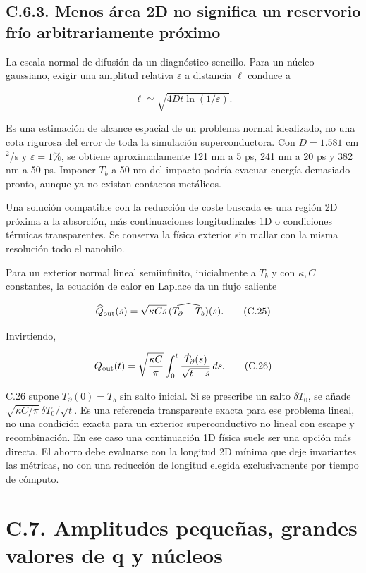 \documentclass[
  spanish,
  10pt,
  a4paper,
]{article}
\begin{document}
\subsection{C.6.3. Menos área 2D no significa un reservorio frío
arbitrariamente
próximo}\label{c.6.3.-menos-uxe1rea-2d-no-significa-un-reservorio-fruxedo-arbitrariamente-pruxf3ximo}

La escala normal de difusión da un diagnóstico sencillo. Para un núcleo
gaussiano, exigir una amplitud relativa \(\varepsilon\) a distancia
\(\ell\) conduce a

\[
\ell\simeq\sqrt{4Dt\ln(1/\varepsilon)}. \tag{C.24}
\]

Es una estimación de alcance espacial de un problema normal idealizado,
no una cota rigurosa del error de toda la simulación superconductora.
Con \(D=1.581\) cm\(^2\)/s y \(\varepsilon=1\%\), se obtiene
aproximadamente 121 nm a 5 ps, 241 nm a 20 ps y 382 nm a 50 ps. Imponer
\(T_b\) a 50 nm del impacto podría evacuar energía demasiado pronto,
aunque ya no existan contactos metálicos.

Una solución compatible con la reducción de coste buscada es una región
2D próxima a la absorción, más continuaciones longitudinales 1D o
condiciones térmicas transparentes. Se conserva la física exterior sin
mallar con la misma resolución todo el nanohilo.

Para un exterior normal lineal semiinfinito, inicialmente a \(T_b\) y
con \(\kappa,C\) constantes, la ecuación de calor en Laplace da un flujo
saliente

\[
\widehat Q_{\rm out}(s)=\sqrt{\kappa Cs}\,
\widehat{(T_{\partial}-T_b)}(s). \tag{C.25}
\]

Invirtiendo,

\[
Q_{\rm out}(t)=\sqrt{\frac{\kappa C}{\pi}}
\int_0^t\frac{\dot T_{\partial}(s)}{\sqrt{t-s}}\,ds. \tag{C.26}
\]

C.26 supone \(T_\partial(0)=T_b\) sin salto inicial. Si se prescribe un
salto \(\delta T_0\), se añade
\(\sqrt{\kappa C/\pi}\,\delta T_0/\sqrt t\). Es una referencia
transparente exacta para ese problema lineal, no una condición exacta
para un exterior superconductivo no lineal con escape y recombinación.
En ese caso una continuación 1D física suele ser una opción más directa.
El ahorro debe evaluarse con la longitud 2D mínima que deje invariantes
las métricas, no con una reducción de longitud elegida exclusivamente
por tiempo de cómputo.

\section{C.7. Amplitudes pequeñas, grandes valores de q y
núcleos}\label{c.7.-amplitudes-pequeuxf1as-grandes-valores-de-q-y-nuxfacleos}
\end{document}
